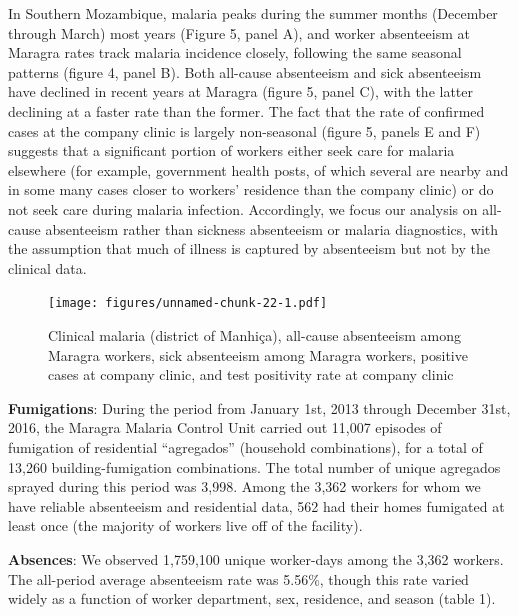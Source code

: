 \documentclass[]{article}
\begin{document}
In Southern Mozambique, malaria peaks during the summer months (December
through March) most years (Figure 5, panel A), and worker absenteeism at
Maragra rates track malaria incidence closely, following the same
seasonal patterns (figure 4, panel B). Both all-cause absenteeism and
sick absenteeism have declined in recent years at Maragra (figure 5,
panel C), with the latter declining at a faster rate than the former.
The fact that the rate of confirmed cases at the company clinic is
largely non-seasonal (figure 5, panels E and F) suggests that a
significant portion of workers either seek care for malaria elsewhere
(for example, government health posts, of which several are nearby and
in some many cases closer to workers' residence than the company clinic)
or do not seek care during malaria infection. Accordingly, we focus our
analysis on all-cause absenteeism rather than sickness absenteeism or
malaria diagnostics, with the assumption that much of illness is
captured by absenteeism but not by the clinical data.

\begin{figure}
\centering
\texttt{[image: figures/unnamed-chunk-22-1.pdf]}
\caption{Clinical malaria (district of Manhiça), all-cause absenteeism
among Maragra workers, sick absenteeism among Maragra workers, positive
cases at company clinic, and test positivity rate at company clinic}
\end{figure}

\textbf{Fumigations}: During the period from January 1st, 2013 through
December 31st, 2016, the Maragra Malaria Control Unit carried out 11,007
episodes of fumigation of residential ``agregados'' (household
combinations), for a total of 13,260 building-fumigation combinations.
The total number of unique agregados sprayed during this period was
3,998. Among the 3,362 workers for whom we have reliable absenteeism and
residential data, 562 had their homes fumigated at least once (the
majority of workers live off of the facility).

\textbf{Absences}: We observed 1,759,100 unique worker-days among the
3,362 workers. The all-period average absenteeism rate was 5.56\%,
though this rate varied widely as a function of worker department, sex,
residence, and season (table 1).
\end{document}
